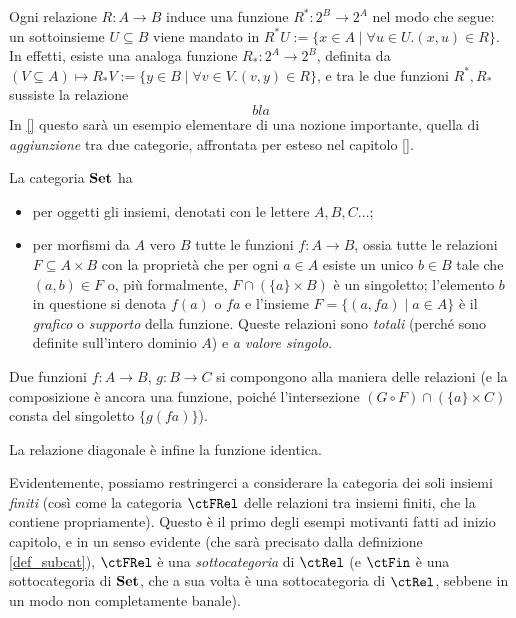 \begin{remark}\label{klext_delle_relazioni}
  Ogni relazione $R : A\to B$ induce una funzione $R^* : 2^B\to 2^A$ nel modo che segue: un sottoinsieme $U\subseteq B$ viene mandato in $R^*U:=\{x\in A\mid \forall u\in U.(x,u)\in R\}$. In effetti, esiste una analoga funzione $R_* : 2^A\to 2^B$, definita da $(V\subseteq A) \mapsto R_*V:= \{y\in B\mid \forall v\in V.(v,y)\in R\}$, e tra le due funzioni $R^*, R_*$ sussiste la relazione 
\[bla\]
In \ref{} questo sarà un esempio elementare di una nozione importante, quella di \emph{aggiunzione} tra due categorie, affrontata per esteso nel capitolo \ref{}.
\end{remark}
\begin{example}\label{ex_cat_insiemi}
	La categoria \(\mathbf{Set}\) ha
	\begin{itemize}
		\item per oggetti gli insiemi, denotati con le lettere \(A,B,C\dots\);
		\item per morfismi da \(A\) vero \(B\) tutte le funzioni \(f : A\to B\), ossia tutte le relazioni \(F\subseteq A\times B\) con la proprietà che per ogni \(a\in A\) esiste un unico \(b\in B\) tale che \((a,b)\in F\) o, più formalmente, \(F\cap(\{a\}\times B)\) è un singoletto; l'elemento \(b\) in questione si denota \(f(a)\) o \(fa\) e l'insieme \(F = \{(a,fa)\mid a\in A\}\) è il \emph{grafico} o \emph{supporto} della funzione. Queste relazioni sono \emph{totali} (perché sono definite sull'intero dominio \(A\)) e \emph{a valore singolo}.
	\end{itemize}
	Due funzioni \(f : A\to B\), \(g : B\to C\) si compongono alla maniera delle relazioni (e la composizione è ancora una funzione, poiché l'intersezione \((G\circ F)\cap (\{a\}\times C)\) consta del singoletto \(\{g(fa)\}\)).

	La relazione diagonale è infine la funzione identica.
\end{example}
Evidentemente, possiamo restringerci a considerare la categoria dei soli insiemi \emph{finiti} (così come la categoria \(\ctFRel\) delle relazioni tra insiemi finiti, che la contiene propriamente). Questo è il primo degli esempi motivanti fatti ad inizio capitolo, e in un senso evidente (che sarà precisato dalla definizione \ref{def_subcat}), \(\ctFRel\) è una \emph{sottocategoria} di \(\ctRel\) (e \(\ctFin\) è una sottocategoria di \(\mathbf{Set}\), che a sua volta è una sottocategoria di \(\ctRel\), sebbene in un modo non completamente banale).
